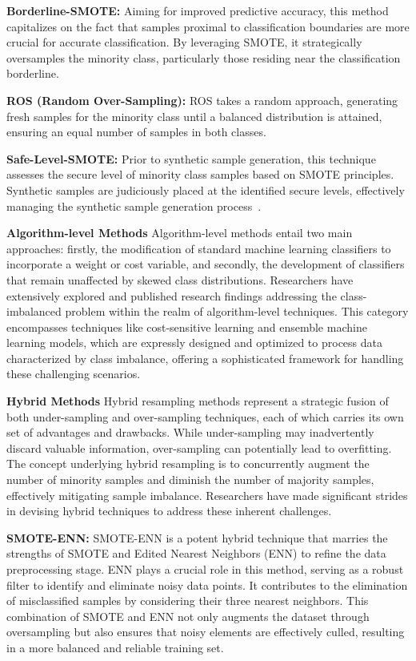 \textbf{Borderline-SMOTE:} Aiming for improved predictive accuracy, this method capitalizes on the fact that samples proximal to classification boundaries are more crucial for accurate classification. By leveraging SMOTE, it strategically oversamples the minority class, particularly those residing near the classification borderline.

\textbf{ROS (Random Over-Sampling):} ROS takes a random approach, generating fresh samples for the minority class until a balanced distribution is attained, ensuring an equal number of samples in both classes.

\textbf{Safe-Level-SMOTE:} Prior to synthetic sample generation, this technique assesses the secure level of minority class samples based on SMOTE principles. Synthetic samples are judiciously placed at the identified secure levels, effectively managing the synthetic sample generation process~\cite{Tarawneh2020,Fotouhi2019,Khushi2021}⁠. 


\textbf{Algorithm-level Methods} 
Algorithm-level methods entail two main approaches: firstly, the modification of standard machine learning classifiers to incorporate a weight or cost variable, and secondly, the development of classifiers that remain unaffected by skewed class distributions. Researchers have extensively explored and published research findings addressing the class-imbalanced problem within the realm of algorithm-level techniques. This category encompasses techniques like cost-sensitive learning and ensemble machine learning models, which are expressly designed and optimized to process data characterized by class imbalance, offering a sophisticated framework for handling these challenging scenarios.


\textbf{Hybrid Methods} 
Hybrid resampling methods represent a strategic fusion of both under-sampling and over-sampling techniques, each of which carries its own set of advantages and drawbacks. While under-sampling may inadvertently discard valuable information, over-sampling can potentially lead to overfitting. The concept underlying hybrid resampling is to concurrently augment the number of minority samples and diminish the number of majority samples, effectively mitigating sample imbalance. Researchers have made significant strides in devising hybrid techniques to address these inherent challenges. 

\textbf{SMOTE-ENN:} SMOTE-ENN is a potent hybrid technique that marries the strengths of SMOTE and Edited Nearest Neighbors (ENN) to refine the data preprocessing stage. ENN plays a crucial role in this method, serving as a robust filter to identify and eliminate noisy data points. It contributes to the elimination of misclassified samples by considering their three nearest neighbors. This combination of SMOTE and ENN not only augments the dataset through oversampling but also ensures that noisy elements are effectively culled, resulting in a more balanced and reliable training set.

